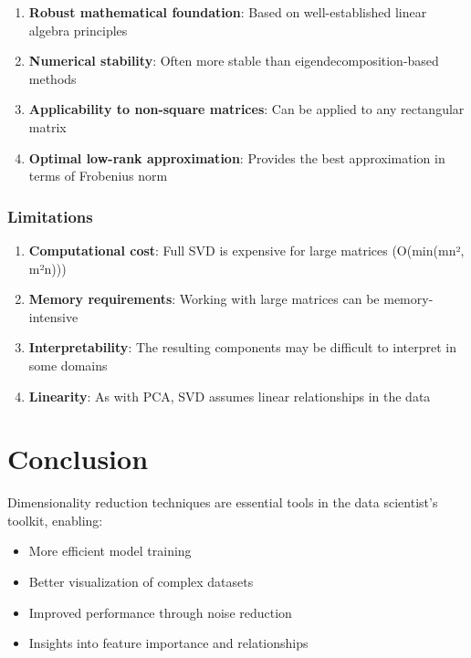 \documentclass[
  letterpaper,
  DIV=11,
  numbers=noendperiod]{scrreprt}
\providecommand{\tightlist}{%
  \setlength{\itemsep}{0pt}\setlength{\parskip}{0pt}}\usepackage{longtable,booktabs,array}
\begin{document}
\begin{enumerate}
\def\labelenumi{\arabic{enumi}.}
\tightlist
\item
  \textbf{Robust mathematical foundation}: Based on well-established
  linear algebra principles
\item
  \textbf{Numerical stability}: Often more stable than
  eigendecomposition-based methods
\item
  \textbf{Applicability to non-square matrices}: Can be applied to any
  rectangular matrix
\item
  \textbf{Optimal low-rank approximation}: Provides the best
  approximation in terms of Frobenius norm
\end{enumerate}

\subsubsection{Limitations}\label{limitations}

\begin{enumerate}
\def\labelenumi{\arabic{enumi}.}
\tightlist
\item
  \textbf{Computational cost}: Full SVD is expensive for large matrices
  (O(min(mn², m²n)))
\item
  \textbf{Memory requirements}: Working with large matrices can be
  memory-intensive
\item
  \textbf{Interpretability}: The resulting components may be difficult
  to interpret in some domains
\item
  \textbf{Linearity}: As with PCA, SVD assumes linear relationships in
  the data
\end{enumerate}

\section{Conclusion}\label{conclusion}

Dimensionality reduction techniques are essential tools in the data
scientist's toolkit, enabling:

\begin{itemize}
\tightlist
\item
  More efficient model training
\item
  Better visualization of complex datasets
\item
  Improved performance through noise reduction
\item
  Insights into feature importance and relationships
\end{itemize}
\end{document}
